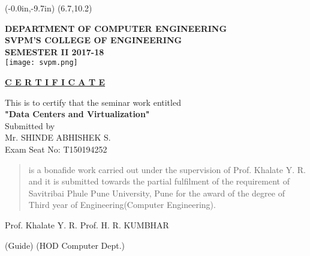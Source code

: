 \documentclass[12pt,a4paper]{report}
\begin{document}



\newpage
\pagestyle{empty}
	\thisfancyput(-0.0in,-9.7in){%
\setlength{\unitlength}{1in}\framebox(6.7,10.2)}
\begin{center}
{\bf DEPARTMENT OF COMPUTER ENGINEERING \\
SVPM'S COLLEGE OF ENGINEERING }\\
{\bf SEMESTER II 2017-18}\\
\vspace{0.2in}
\texttt{[image: svpm.png]}
\end{center}
\vspace{0.1in}
\begin{center}
\textbf{\underline{C E R T I F I C A T E}}\\
\vspace{0.1in}
\end{center}
		\noindent
  				\setlength{\baselineskip}{1.5\baselineskip}
	\begin{center}
This is to certify that the seminar work entitled\\
		\textbf{\large "Data Centers and Virtualization" }\\

Submitted by \\
 Mr. SHINDE ABHISHEK S.   \\ Exam Seat No: T150194252
	\end{center}

\begin{quote}
is a bonafide work carried out under the supervision of Prof. Khalate Y. R. and it is submitted towards the partial fulfilment of the requirement of Savitribai Phule Pune University, Pune for the award of the degree of Third year of Engineering(Computer Engineering).   				  
\end{quote}
		\noindent 
		\vspace{0.3 in}

		
		\hspace{0.2in}Prof. Khalate Y. R.      \hspace{1.2in} 			Prof. H. R. KUMBHAR\\
	\centerline {\hspace{0.2in}(Guide)        \hspace{1.2in}  (HOD Computer Dept.)}\\
			   			   	\vspace{0.3 in}	
			   
\end{document}
